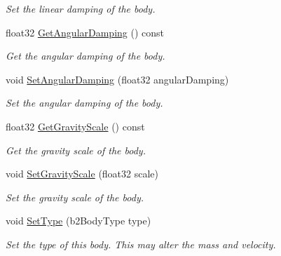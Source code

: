 \begin{DoxyCompactItemize}
\begin{DoxyCompactList}\small\item\em Set the linear damping of the body. \end{DoxyCompactList}\item 
\mbox{\label{classb2_body_a151f5e81e44037883f61b67821704999}} 
float32 \hyperlink{classb2_body_a151f5e81e44037883f61b67821704999}{Get\+Angular\+Damping} () const
\begin{DoxyCompactList}\small\item\em Get the angular damping of the body. \end{DoxyCompactList}\item 
\mbox{\label{classb2_body_a73a79541b18394fa224d2eae8ad493e8}} 
void \hyperlink{classb2_body_a73a79541b18394fa224d2eae8ad493e8}{Set\+Angular\+Damping} (float32 angular\+Damping)
\begin{DoxyCompactList}\small\item\em Set the angular damping of the body. \end{DoxyCompactList}\item 
\mbox{\label{classb2_body_aa570b2310248b4b3bd776836e839bc45}} 
float32 \hyperlink{classb2_body_aa570b2310248b4b3bd776836e839bc45}{Get\+Gravity\+Scale} () const
\begin{DoxyCompactList}\small\item\em Get the gravity scale of the body. \end{DoxyCompactList}\item 
\mbox{\label{classb2_body_a8e66a570c2aeee93b29d84cae861a612}} 
void \hyperlink{classb2_body_a8e66a570c2aeee93b29d84cae861a612}{Set\+Gravity\+Scale} (float32 scale)
\begin{DoxyCompactList}\small\item\em Set the gravity scale of the body. \end{DoxyCompactList}\item 
\mbox{\label{classb2_body_a34ff1c84b10b74eb990749a025a1b1ad}} 
void \hyperlink{classb2_body_a34ff1c84b10b74eb990749a025a1b1ad}{Set\+Type} (b2\+Body\+Type type)
\begin{DoxyCompactList}\small\item\em Set the type of this body. This may alter the mass and velocity. \end{DoxyCompactList}\item 

\end{DoxyCompactItemize}
